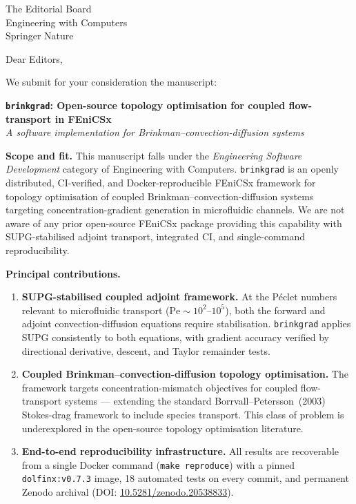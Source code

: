 \documentclass[12pt,a4paper]{letter}
\date{2026}
\begin{document}
\begin{letter}{
    The Editorial Board\\
    Engineering with Computers\\
    Springer Nature
}

\opening{Dear Editors,}

We submit for your consideration the manuscript:

\begin{center}
\textbf{\texttt{brinkgrad}: Open-source topology optimisation for coupled flow-transport in FEniCSx}\\[4pt]
{\normalfont\textit{A software implementation for Brinkman--convection-diffusion systems}}
\end{center}

\textbf{Scope and fit.}
This manuscript falls under the \emph{Engineering Software Development}
category of Engineering with Computers.
\texttt{brinkgrad} is an openly distributed, CI-verified, and
Docker-reproducible FEniCSx framework for topology optimisation of
coupled Brinkman--convection-diffusion systems targeting
concentration-gradient generation in microfluidic channels.
We are not aware of any prior open-source FEniCSx package providing
this capability with SUPG-stabilised adjoint transport, integrated CI,
and single-command reproducibility.

\textbf{Principal contributions.}
\begin{enumerate}
\item \textbf{SUPG-stabilised coupled adjoint framework.}
At the P\'{e}clet numbers relevant to microfluidic transport
($\mathrm{Pe}\sim10^2$--$10^5$), both the forward and adjoint
convection-diffusion equations require stabilisation.
\texttt{brinkgrad} applies SUPG consistently to both equations,
with gradient accuracy verified by directional derivative,
descent, and Taylor remainder tests.

\item \textbf{Coupled Brinkman--convection-diffusion topology optimisation.}
The framework targets concentration-mismatch objectives for
coupled flow-transport systems --- extending the standard
Borrvall--Petersson~(2003) Stokes-drag framework to include
species transport.
This class of problem is underexplored in the open-source
topology optimisation literature.

\item \textbf{End-to-end reproducibility infrastructure.}
All results are recoverable from a single Docker command
(\texttt{make reproduce}) with a pinned \texttt{dolfinx:v0.7.3} image,
18 automated tests on every commit, and permanent Zenodo archival
(DOI: \href{https://doi.org/10.5281/zenodo.20538833}{10.5281/zenodo.20538833}).


\end{enumerate}
\end{letter}
\end{document}
